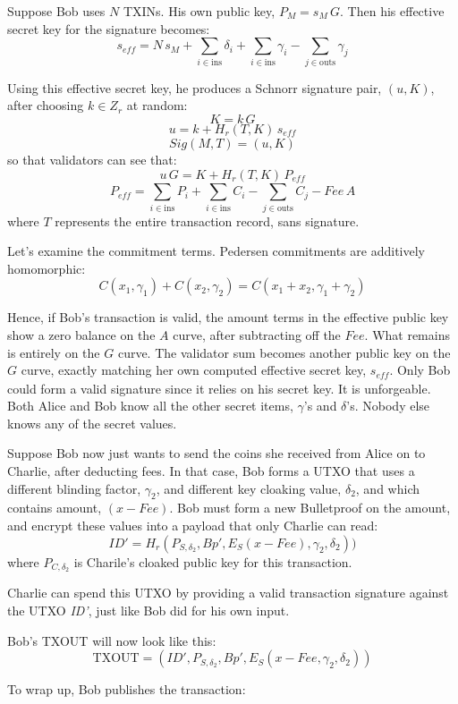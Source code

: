 \documentclass[a4paper, 10pt, conference]{ieeeconf}
\begin{document}
Suppose Bob uses $N$ TXINs. His own public key, $P_M = s_M \, G$. Then his effective secret key for the signature becomes:
$$s_{\mathit{eff}} = N \, s_M + \sum_{i \in \text{ins}} {\delta_i} + \sum_{i \in \text{ins}}{\gamma_i} - \sum_{j \in \text{outs}}{ \gamma_j}$$

Using this effective secret key, he produces a Schnorr signature pair, $(u, K)$, after choosing $k \in Z_r$ at random:
$$K = k \, G$$
$$u = k + H_r(T, K) \, s_{\mathit{eff}}$$
$$Sig(M,T) = (u, K)$$
so that validators can see that:
$$u \, G = K + H_r(T, K) \, P_{\mathit{eff}}$$
$$P_{\mathit{eff}} = \sum_{i \in \text{ins}}{P_i} + \sum_{i \in \text{ins}}{C_i} - \sum_{j \in \text{outs}}{C_j} - \mathit{Fee} \, A$$
where $T$ represents the entire transaction record, sans signature.

Let's examine the commitment terms. Pedersen commitments are additively homomorphic:
$$C(x_1, \gamma_1) + C(x_2, \gamma_2) = C(x_1 + x_2, \gamma_1 + \gamma_2)$$

Hence, if Bob's transaction is valid, the amount terms in the effective public key show a zero balance on the $A$ curve, after subtracting off the $\mathit{Fee}$. What remains is entirely on the $G$ curve. The validator sum becomes another public key on the $G$ curve, exactly matching her own computed effective secret key, $s_{\mathit{eff}}$. Only Bob could form a valid signature since it relies on his secret key. It is unforgeable. Both Alice and Bob know all the other secret items, $\gamma$'s and $\delta$'s. Nobody else knows any of the secret values.

Suppose Bob now just wants to send the coins she received from Alice on to Charlie, after deducting fees. In that case, Bob forms a UTXO that uses a different blinding factor, $\gamma_2$, and different key cloaking value, $\delta_2$, and which contains amount, $(x - \mathit{Fee})$. Bob must form a new Bulletproof on the amount, and encrypt these values into a payload that only Charlie can read:
$$ID' = H_r(P_{S, \delta_2}, Bp', E_S(x - Fee), \gamma_2, \delta_2))$$
where $P_{C, \delta_2}$ is Charile's cloaked public key for this transaction. 

Charlie can spend this UTXO by providing a valid transaction signature against the UTXO \textit{ID'}, just like Bob did for his own input. 

Bob's TXOUT will now look like this:
$$\text{TXOUT} = (ID', P_{S, \delta_2}, Bp', E_S(x - Fee, \gamma_2, \delta_2))$$

To wrap up, Bob publishes the transaction:
\end{document}
